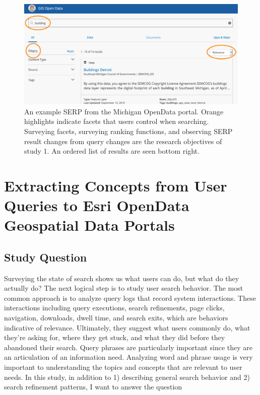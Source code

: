 \begin{figure}[H]
    \centering
    \includegraphics[width=1\textwidth]{../figures/Methods_OpenData.png}
    \caption{An example SERP from the Michigan OpenData portal. Orange highlights indicate facets that users control when searching. Surveying facets, surveying ranking functions, and observing SERP result changes from query changes are the research objectives of study 1. An ordered list of results are seen bottom right.}
    \label{fig:Methods_OpenData}
\end{figure}

\section{Extracting Concepts from User Queries to Esri OpenData Geospatial Data Portals}

\subsection{Study Question}
Surveying the state of search shows us what users can do, but what do they actually do? The next logical step is to study user search behavior. The most common approach is to analyze query logs that record system interactions. These interactions including query executions, search refinements, page clicks, navigation, downloads, dwell time, and search exits, which are behaviors indicative of relevance. Ultimately, they suggest what users commonly do, what they're asking for, where they get stuck, and what they did before they abandoned their search. Query phrases are particularly important since they are an articulation of an information need. Analyzing word and phrase usage is very important to understanding the topics and concepts that are relevant to user needs. In this study, in addition to 1) describing general search behavior and 2) search refinement patterns, I want to answer the question
\linebreak

